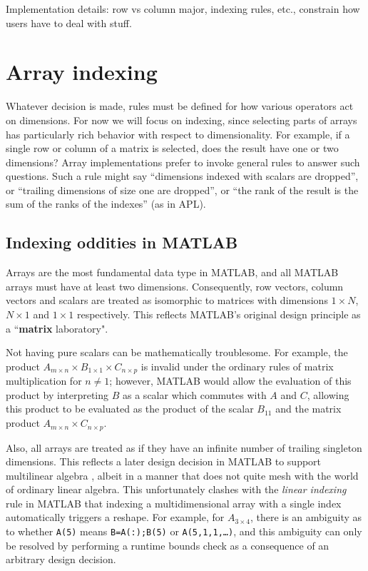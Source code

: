 \documentclass[preprint]{sigplanconf}
\newcommand{\MATLAB}{\textsc{MATLAB}}
\begin{document}
Implementation details: row vs column major, indexing rules, etc., constrain
how users have to deal with stuff.

\section{Array indexing}

Whatever decision is made, rules must be defined for how various operators act
on dimensions. For now we will focus on indexing, since selecting parts of
arrays has particularly rich behavior with respect to dimensionality. For
example, if a single row or column of a matrix is selected, does the result
have one or two dimensions? Array implementations prefer to invoke general
rules to answer such questions. Such a rule might say ``dimensions indexed
with scalars are dropped'', or ``trailing dimensions of size one are
dropped'', or ``the rank of the result is the sum of the ranks of the
indexes'' (as in APL).


\subsection{Indexing oddities in MATLAB}

Arrays are the most fundamental data type in \MATLAB{}, and all \MATLAB{}
arrays must have at least two dimensions. Consequently, row vectors, column
vectors and scalars are treated as isomorphic to matrices with dimensions
$1\times N$, $N\times1$ and $1\times1$ respectively. This reflects \MATLAB's
original design principle as a ``\textbf{matrix} laboratory".

Not having pure scalars can be mathematically troublesome. For example, the
product $A_{m\times n} \times B_{1\times 1} \times C_{n\times p}$ is invalid
under the ordinary rules of matrix multiplication for $n\ne1$; however,
\MATLAB{} would allow the evaluation of this product by interpreting $B$ as a
scalar which commutes with $A$ and $C$, allowing this product to be evaluated
as the product of the scalar $B_{11}$ and the matrix product $A_{m\times n}
\times C_{n\times p}$.


Also, all arrays are treated as if they have an infinite number of trailing
singleton dimensions. This reflects a later design decision in \MATLAB{} to
support multilinear algebra \cite{matlabman:ma},  albeit in a manner that does
not quite mesh with the world of ordinary linear algebra. This unfortunately
clashes with the \textit{linear indexing} rule in \MATLAB{} that indexing a
multidimensional array with a single index automatically triggers a reshape.
For example, for $A_{3\times4}$, there is an ambiguity as to whether
\texttt{A(5)} means \texttt{B=A(:);B(5)} or \texttt{A(5,1,1,\dots)}, and this
ambiguity can only be resolved by performing a runtime bounds check as a
consequence of an arbitrary design decision.
\end{document}
